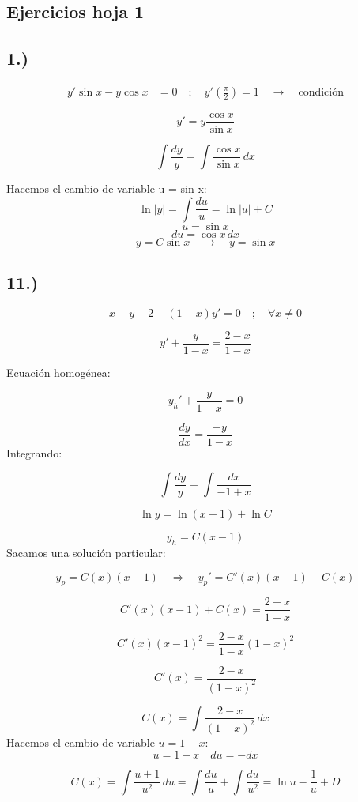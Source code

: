 \documentclass[a4paper,12pt]{article}
\begin{document}
\subsection*{Ejercicios hoja 1}

\subsection*{1.)}
\[
\begin{aligned}
y' \sin x - y \cos x &= 0 
\quad ;\quad 
y'\!\left( \frac{\pi}{2} \right) = 1 \quad \rightarrow \quad \text{condición}
\end{aligned}
\]

\[
y' = y \frac{\cos x}{\sin x}
\]

\[
\int \frac{dy}{y} = \int \frac{\cos x}{\sin x}\, dx
\]

\medskip
\noindent
Hacemos el cambio de variable u = sin x:
\[
\ln |y| = \int \frac{du}{u} = \ln |u| + C
\]
\[
u = \sin x
\]
\[
du = \cos x\, dx
\]
\[
y = C \sin x \quad \rightarrow \quad y = \sin x
\]

\subsection*{11.)}
\[
x + y - 2 + (1 - x) y' = 0 \quad ; \quad \forall x \neq 0
\]

\[
y' + \frac{y}{1 - x} = \frac{2 - x}{1 - x}
\]

Ecuación homogénea:

\[
y_h' + \frac{y}{1 - x} = 0
\]

\[
\frac{dy}{dx} = \frac{-y}{1 - x}
\]
\newpage
\noindent
Integrando:

\[
\int \frac{dy}{y} = \int \frac{dx}{-1 + x}
\]

\[
\ln y = \ln(x - 1) + \ln C
\]

\[
y_h = C (x - 1)
\]
Sacamos una solución particular:

\[
y_p = C(x)(x - 1) \quad \Rightarrow \quad y_p' = C'(x)(x - 1) + C(x)
\]

\[
C'(x)(x - 1) + C(x) = \frac{2 - x}{1 - x}
\]

\[
C'(x)(x - 1)^2 = \frac{2 - x}{1 - x} (1 - x)^2
\]

\[
C'(x) = \frac{2 - x}{(1 - x)^2}
\]

\[
C(x) = \int \frac{2 - x}{(1 - x)^2}\, dx
\]
Hacemos el cambio de variable \(u = 1 - x\):
\[
u = 1 - x \quad du = -dx
\]

\[
C(x) = \int \frac{u + 1}{u^2}\, du = \int \frac{du}{u} + \int \frac{du}{u^2} = \ln u - \frac{1}{u} + D
\]
\end{document}
